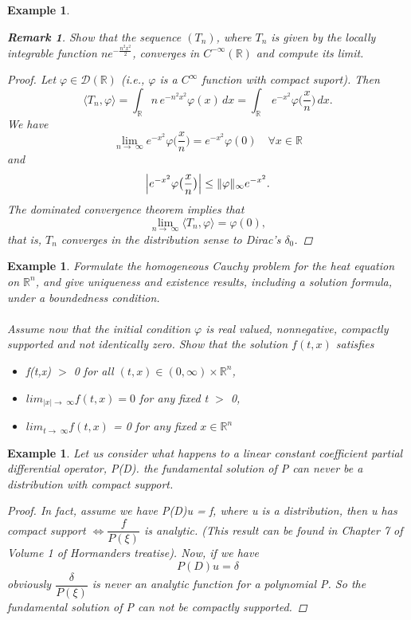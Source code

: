 \documentclass[12pt, oneside, a4paper]{article}
\theoremstyle{dfn}
\newtheorem{rem}[thm]{Remark}
\newtheorem{ex}[thm]{Example}
\def\Rbb{\ensuremath{\mathbb{R}}}
\newcommand{\gt}{>}
\newcommand{\To}{\ensuremath{\rightarrow \;}}
\renewcommand{\phi}{\varphi}
\begin{document}
\begin{ex}
\begin{rem}
Show that the sequence $(T_n)$, where
 $T_n$ is given by the locally integrable function $ne^{-\frac{n^{2}x^{2}}{2}}$,
 converges in $C^{-\infty}(\mathbb{R})$ and compute its limit. 
\end{rem}
\begin{proof}
 Let $\phi\in\mathcal{D}(\mathbb{R})$ (i.e., $\phi$ is a $C^\infty$ function with compact suport). Then
$$
\langle T_n,\phi\rangle=\int_\mathbb{R}n\,e^{-n^2x^2}\phi(x)\,dx=\int_\mathbb{R}\,e^{-x^2}\phi\bigl(\frac xn\bigr)\,dx.
$$
We have 
$$
\lim_{n\To\infty}e^{-x^2}\phi\bigl(\frac xn\bigr)=e^{-x^2}\phi(0)\quad\forall x\in\mathbb{R}
$$
and
$$
\Bigl|e^{-x^2}\phi\bigl(\frac xn\bigr)\Bigr|\le \|\phi\|_\infty e^{-x^2}.
$$
The dominated convergence theorem implies that
$$
\lim_{n\To\infty}\langle T_n,\phi\rangle=\phi(0),
$$
that is, $T_n$ converges in the distribution sense to Dirac's $\delta_0$.
\end{proof}
\end{ex}
\begin{ex}
 Formulate the homogeneous Cauchy problem for the heat equation on $\Rbb^{n}$, and give uniqueness and existence 
results, including a solution formula, under a boundedness condition.
\paragraph{} Assume now that the initial condition $\phi$ is real valued, nonnegative, compactly supported and not 
identically zero. Show that the solution $f(t,x)$ satisfies
\begin{itemize}
 \item f(t,x) $\gt$ 0 for all $(t,x) \in (0, \infty) \times \Rbb^n$,\
\item $lim_{|x| \To \infty}f(t,x) = 0$ for any fixed t $\gt$ 0,
\item $lim_{t \To \infty} f(t,x)$ = 0 for any fixed $x \in \Rbb^n$
\end{itemize}
\end{ex}
\begin{ex}
 Let us consider what happens to a linear constant coefficient partial differential operator, P(D).
\textit{the fundamental solution of P can never be a distribution with compact support}.
\begin{proof}
In fact, assume we have P(D)u = f, where u is a distribution, then u has compact support 
$\iff \dfrac{f}{P(\xi)}$ is analytic. (This result can be found in Chapter 7 of Volume 1 of Hormanders
treatise). 
Now, if we have 
\begin{equation}
 P(D)u = \delta
\end{equation}
obviously $\dfrac{\delta}{P(\xi)}$ is never an analytic function for a polynomial P. So the fundamental solution
of P can not be compactly supported. 
\end{proof}
\end{ex}
\end{document}
